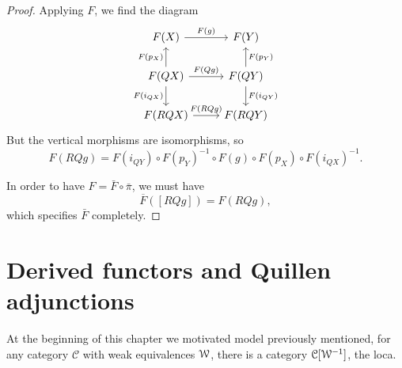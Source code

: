 \documentclass[main.tex]{subfiles}
\begin{document}
\begin{proof}
  Applying $F$, we find the diagram
  \begin{equation*}
    \begin{tikzcd}
      F(X)
      \arrow[r, "F(g)"]
      \arrow[d, leftarrow, swap, "F(p_{X})"]
      & F(Y)
      \arrow[d, leftarrow, "F(p_{Y})"]
      \\
      F(QX)
      \arrow[r, "F(Qg)"]
      \arrow[d, swap, "F(i_{QX})"]
      & F(QY)
      \arrow[d, "F(i_{QY})"]
      \\
      F(RQX)
      \arrow[r, "F(RQg)"]
      & F(RQY)
    \end{tikzcd}
  \end{equation*}
  But the vertical morphisms are isomorphisms, so
  \begin{equation*}
    F(RQg) = F(i_{QY}) \circ F(p_{Y})^{-1} \circ F(g) \circ F(p_{X}) \circ F(i_{QX})^{-1}.
  \end{equation*}

  In order to have $F = \bar{F} \circ \bar{\pi}$, we must have
  \begin{equation*}
    \overline{F}([RQg]) = F(RQg),
  \end{equation*}
  which specifies $\bar{F}$ completely.
\end{proof}

\section{Derived functors and Quillen adjunctions}
\label{sec:quillen_adjunctions}

At the beginning of this chapter we motivated model previously mentioned, for any category $\mathcal{C}$ with weak equivalences $\mathcal{W}$, there is a category $\mathcal{C}[\mathcal{W}^{-1}]$, the loca.
\end{document}

